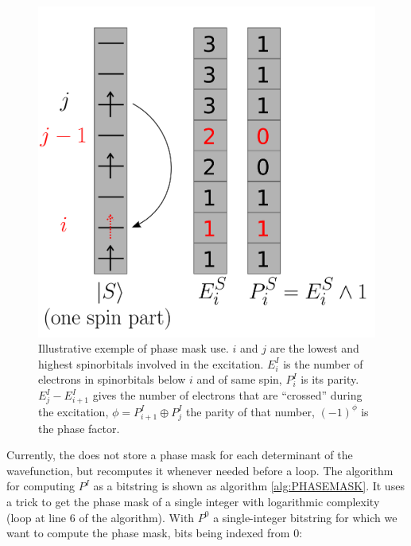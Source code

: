 \documentclass[./thesis.tex]{subfiles}
\begin{document}
                
\begin{figure}[h!]
	\begin{center}
		\includegraphics[width=0.5\columnwidth]{figures/determinant_driven/phase}
		\caption[phase mask illustration]{
		Illustrative exemple of phase mask use. $i$ and $j$ are the lowest and highest spinorbitals involved in the excitation. $E_i^I$ is the number of electrons in spinorbitals below $i$ and of same spin, $P_i^I$ is its parity. $E_j^I - E_{i+1}^I$ gives the number of electrons that are ``crossed'' during the excitation, $\phi = P^I_{i+1} \oplus P^I_j$ the parity of that number, $(-1)^\phi$ is the phase factor.
		}
		\label{generators_selectors}
	\end{center}
\end{figure}


Currently, the \QP does not store a phase mask for each determinant of the wavefunction, but recomputes it whenever needed before a loop.
The algorithm for computing $P^I$ as a bitstring is shown as algorithm \ref{alg:PHASEMASK}. It uses a trick to get the phase mask of a single integer with logarithmic complexity (loop at line 6 of the algorithm). With $P^0$ a single-integer bitstring for which we want to compute the phase mask, bits being indexed from $0$:
\end{document}
